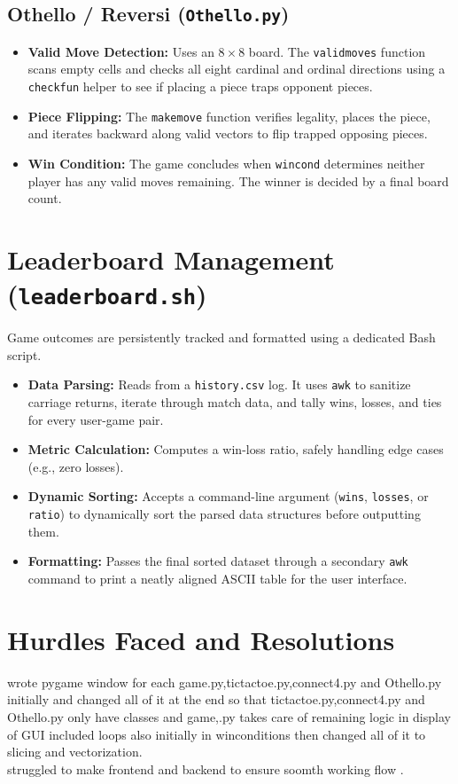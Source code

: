 \documentclass{report}
\begin{document}
\subsection{Othello / Reversi (\texttt{Othello.py})}
\begin{itemize}
    \item \textbf{Valid Move Detection:} Uses an $8 \times 8$ board. The \texttt{validmoves} function scans empty cells and checks all eight cardinal and ordinal directions using a \texttt{checkfun} helper to see if placing a piece traps opponent pieces.
    \item \textbf{Piece Flipping:} The \texttt{makemove} function verifies legality, places the piece, and iterates backward along valid vectors to flip trapped opposing pieces.
    \item \textbf{Win Condition:} The game concludes when \texttt{wincond} determines neither player has any valid moves remaining. The winner is decided by a final board count.
\end{itemize}

\section{Leaderboard Management (\texttt{leaderboard.sh})}
Game outcomes are persistently tracked and formatted using a dedicated Bash script.
\begin{itemize}
    \item \textbf{Data Parsing:} Reads from a \texttt{history.csv} log. It uses \texttt{awk} to sanitize carriage returns, iterate through match data, and tally wins, losses, and ties for every user-game pair.
    \item \textbf{Metric Calculation:} Computes a win-loss ratio, safely handling edge cases (e.g., zero losses).
    \item \textbf{Dynamic Sorting:} Accepts a command-line argument (\texttt{wins}, \texttt{losses}, or \texttt{ratio}) to dynamically sort the parsed data structures before outputting them.
    \item \textbf{Formatting:} Passes the final sorted dataset through a secondary \texttt{awk} command to print a neatly aligned ASCII table for the user interface.
\end{itemize}
\section{Hurdles Faced and Resolutions}
wrote pygame window for each game.py,tictactoe.py,connect4.py and Othello.py initially and changed all of it at the end so that tictactoe.py,connect4.py and Othello.py only have classes and game,.py takes care of remaining logic in display of GUI
included loops also initially in winconditions then changed all of it to slicing and vectorization.
\\
struggled to make frontend and backend to ensure soomth working flow .
\end{document}
